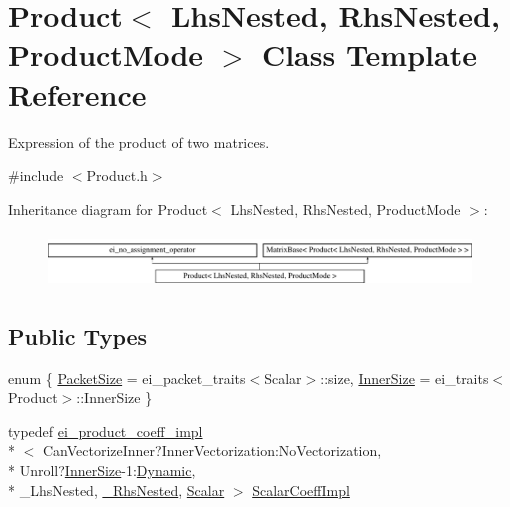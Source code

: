 \hypertarget{class_product}{\section{Product$<$ Lhs\-Nested, Rhs\-Nested, Product\-Mode $>$ Class Template Reference}
\label{class_product}
}


Expression of the product of two matrices.  




{\ttfamily \#include $<$Product.\-h$>$}

Inheritance diagram for Product$<$ Lhs\-Nested, Rhs\-Nested, Product\-Mode $>$\-:\begin{figure}[H]
\begin{center}
\leavevmode
\includegraphics[height=1.443299cm]{class_product}
\end{center}
\end{figure}
\subsection*{Public Types}
\begin{DoxyCompactItemize}
\item 
enum \{ \hyperlink{class_product_aed4106fbae3137a79eecc0b126eda5c7a6815056433cb21ada8e1d722e096bb30}{Packet\-Size} = ei\-\_\-packet\-\_\-traits$<$Scalar$>$\-:\-:size, 
\hyperlink{class_product_aed4106fbae3137a79eecc0b126eda5c7abe4ec3b9d5ac4d3adf94d768f994ac8d}{Inner\-Size} = ei\-\_\-traits$<$Product$>$\-:\-:Inner\-Size
 \}
\item 
typedef \hyperlink{structei__product__coeff__impl}{ei\-\_\-product\-\_\-coeff\-\_\-impl}\\*
$<$ Can\-Vectorize\-Inner?Inner\-Vectorization\-:\-No\-Vectorization, \\*
Unroll?\hyperlink{class_product_aed4106fbae3137a79eecc0b126eda5c7abe4ec3b9d5ac4d3adf94d768f994ac8d}{Inner\-Size}-\/1\-:\hyperlink{_constants_8h_adc9da5be31bdce40c25a92c27999c0e3}{Dynamic}, \\*
\-\_\-\-Lhs\-Nested, \hyperlink{class_product_a6bd9dcf946f54f28090951b0dc48c0f7}{\-\_\-\-Rhs\-Nested}, \hyperlink{class_matrix_base_a625df8339dc2d816cbc0fd66e7dadaf5}{Scalar} $>$ \hyperlink{class_product_a8da86980a3699fb57fea9a803af58708}{Scalar\-Coeff\-Impl}
\end{DoxyCompactItemize}
